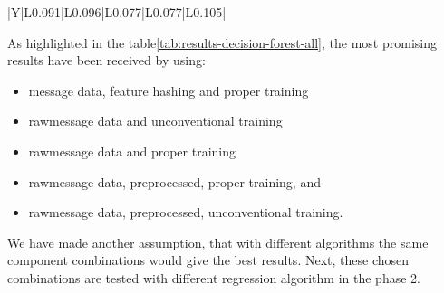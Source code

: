 \begin{table}[htb]
\begin{tabularx}{\textwidth}{|Y|L{0.091\textwidth}|L{0.096\textwidth}|L{0.077\textwidth}|L{0.077\textwidth}|L{0.105\textwidth}|}
        \hline
    \end{tabularx}
    \caption{Results of HML pipeline with Decision Forest regression algorithm in the phase 2.
        \textbf{FHash} means \textit{Feature Hashing},
        \textbf{PropT} indicates \textit{proper training},
        \textbf{UnconT} that \textit{unconventional training} is done in phase 1,
        \textbf{PreP.} means that \textit{text preprocessing} has been used, and
        \textbf{NA} means that \textit{anomaly values has been removed} for comparison (NoAnomalies).
        The most promising comparison metrics and their component combinations are bolded.
    }
    \label{tab:results-decision-forest-all}
\end{table}

As highlighted in the table\ref{tab:results-decision-forest-all},
the most promising results have been received by using:
\begin{itemize}
    \setlength\itemsep{0pt}
    \setlength{\parskip}{0pt}
    \item message data, feature hashing and proper training
    \item rawmessage data and unconventional training
    \item rawmessage data and proper training
    \item rawmessage data, preprocessed, proper training, and
    \item rawmessage data, preprocessed, unconventional training.
\end{itemize}

We have made another assumption,
that with different algorithms
the same component combinations would give the best results.
Next,
these chosen combinations are tested with different regression algorithm in the phase 2.

